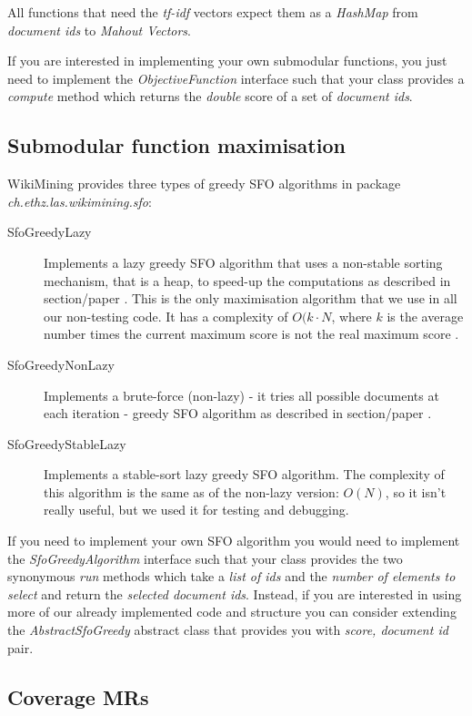 All functions that need the \emph{tf-idf} vectors expect them as a
\emph{HashMap} from \emph{document ids} to \emph{Mahout Vectors}.

If you are interested in implementing your own submodular functions, you just
need to implement the \emph{ObjectiveFunction} interface such that your class
provides a \emph{compute} method which returns the \emph{double} score of a set
of \emph{document ids}.

\subsection{Submodular function maximisation}

WikiMining provides three types of greedy \acf{SFO} algorithms in package
\emph{ch.ethz.las.wikimining.sfo}:
\begin{description}
  \item[SfoGreedyLazy] Implements a lazy greedy \ac{SFO} algorithm that uses a
  non-stable sorting mechanism, that is a heap, to speed-up the computations as
  described in section/paper . This is the only maximisation
  algorithm that we use in all our non-testing code. It has a complexity of
  \(O(k \cdot N\), where \(k\) is the average number times the current maximum
  score is not the real maximum score .
  \item[SfoGreedyNonLazy] Implements a brute-force (non-lazy) - it tries all
  possible documents at each iteration - greedy \ac{SFO} algorithm as described
  in section/paper .
  \item[SfoGreedyStableLazy] Implements a stable-sort lazy greedy \ac{SFO}
  algorithm. The complexity of this algorithm is the same as of the non-lazy
  version: \(O(N)\), so it isn't really useful, but we used it for testing and
  debugging.
\end{description}

If you need to implement your own \acl{SFO} algorithm you would need to
implement the \emph{SfoGreedyAlgorithm} interface such that your class provides
the two synonymous \emph{run} methods which take a \emph{list of ids} and the
\emph{number of elements to select} and return the \emph{selected document
ids}. Instead, if you are interested in using more of our already implemented
code and structure you can consider extending the \emph{AbstractSfoGreedy}
abstract class that provides you with \emph{score, document id} pair.

\subsection{Coverage \aclp{MR}}

